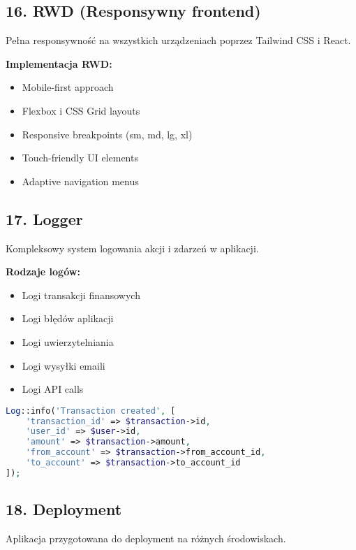 \documentclass[12pt,a4paper]{article}
\begin{document}
    \subsection{16. RWD (Responsywny frontend)}

    Pełna responsywność na wszystkich urządzeniach poprzez Tailwind CSS i React.

    \textbf{Implementacja RWD:}
    \begin{itemize}
        \item Mobile-first approach
        \item Flexbox i CSS Grid layouts
        \item Responsive breakpoints (sm, md, lg, xl)
        \item Touch-friendly UI elements
        \item Adaptive navigation menus
    \end{itemize}

    \subsection{17. Logger}

    Kompleksowy system logowania akcji i zdarzeń w aplikacji.

    \textbf{Rodzaje logów:}
    \begin{itemize}
        \item Logi transakcji finansowych
        \item Logi błędów aplikacji
        \item Logi uwierzytelniania
        \item Logi wysyłki emaili
        \item Logi API calls
    \end{itemize}

    \begin{lstlisting}[language=PHP, caption=Przykład logowania]
Log::info('Transaction created', [
    'transaction_id' => $transaction->id,
    'user_id' => $user->id,
    'amount' => $transaction->amount,
    'from_account' => $transaction->from_account_id,
    'to_account' => $transaction->to_account_id
]);
    \end{lstlisting}

    \subsection{18. Deployment}

    Aplikacja przygotowana do deployment na różnych środowiskach.
\end{document}
